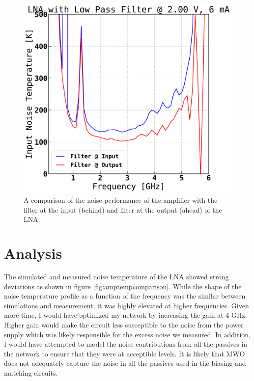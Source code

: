 \documentclass[twocolumn, aps, floatfix]{revtex4-1}
\begin{document}
\begin{itemize}
    \begin{figure}[!htbp]
    \centering
    \includegraphics[scale=0.3]{Filter_noisetemp_comparison.pdf}
    \caption{A comparison of the noise performance of the amplifier with the filter at the input (behind) and filter at the output (ahead) of the LNA.}
    \label{fig:filtertempcomparison}
    \end{figure}

\end{itemize}

\FloatBarrier
\section*{Analysis}

The simulated and measured noise temperature of the LNA showed strong deviations as shown in figure \ref{fig:amptempcomparison}. While the shape of the noise temperature profile as a function of the frequency was the similar between simulations and measurement, it was highly elevated at higher frequencies. Given more time, I would have optimized my network by increasing the gain at 4 GHz. Higher gain would make the circuit less susceptible to the noise from the power supply which was likely responsible for the excess noise we measured. In addition, I would have attempted to model the noise contributions from all the passives in the network to ensure that they were at acceptible levels. It is likely that MWO does not adequately capture the noise in all the passives used in the biasing and matching circuits.
\end{document}
